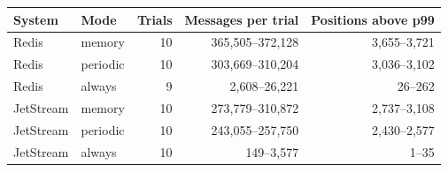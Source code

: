 \begin{tabular}{llrrr}
\toprule
System & Mode & Trials & Messages per trial & Positions above p99\\
\midrule
Redis & memory & 10 & 365,505--372,128 & 3,655--3,721\\
Redis & periodic & 10 & 303,669--310,204 & 3,036--3,102\\
Redis & always & 9 & 2,608--26,221 & 26--262\\
JetStream & memory & 10 & 273,779--310,872 & 2,737--3,108\\
JetStream & periodic & 10 & 243,055--257,750 & 2,430--2,577\\
JetStream & always & 10 & 149--3,577 & 1--35\\
\bottomrule
\end{tabular}
